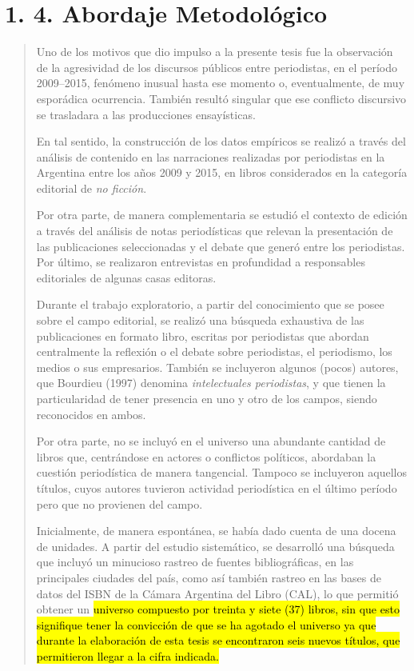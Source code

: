 {\section{1. 4. Abordaje Metodológico}

\begin{quote}
Uno de los motivos que dio impulso a la presente tesis fue la observación de la agresividad de los discursos públicos entre periodistas, en el período 2009--2015, fenómeno inusual hasta ese momento o, eventualmente, de muy esporádica ocurrencia. También resultó singular que ese conflicto discursivo se trasladara a las producciones ensayísticas.

En tal sentido, la construcción de los datos empíricos se realizó a través del análisis de contenido en las narraciones realizadas por periodistas en la Argentina entre los años 2009 y 2015, en libros considerados en la categoría editorial de \emph{no ficción}.

Por otra parte, de manera complementaria se estudió el contexto de edición a través del análisis de notas periodísticas que relevan la presentación de las publicaciones seleccionadas y el debate que generó entre los periodistas. Por último, se realizaron entrevistas en profundidad a responsables editoriales de algunas casas editoras.

Durante el trabajo exploratorio, a partir del conocimiento que se posee sobre el campo editorial, se realizó una búsqueda exhaustiva de las publicaciones en formato libro, escritas por periodistas que abordan centralmente la reflexión o el debate sobre periodistas, el periodismo, los medios o sus empresarios. También se incluyeron algunos (pocos) autores, que Bourdieu (1997) denomina \emph{intelectuales periodistas}, y que tienen la particularidad de tener presencia en uno y otro de los campos, siendo reconocidos en ambos.

Por otra parte, no se incluyó en el universo una abundante cantidad de libros que, centrándose en actores o conflictos políticos, abordaban la cuestión periodística de manera tangencial. Tampoco se incluyeron aquellos títulos, cuyos autores tuvieron actividad periodística en el último período pero que no provienen del campo.

Inicialmente, de manera espontánea, se había dado cuenta de una docena de unidades. A partir del estudio sistemático, se desarrolló una búsqueda que incluyó un minucioso rastreo de fuentes bibliográficas, en las principales ciudades del país, como así también rastreo en las bases de datos del ISBN de la Cámara Argentina del Libro (CAL), lo que permitió obtener un \hl{universo compuesto por treinta y siete (37) libros, sin que esto signifique tener la convicción de que se ha agotado el universo ya que durante la elaboración de esta tesis se encontraron seis nuevos títulos, que permitieron llegar a la cifra indicada.}


\end{quote}}
